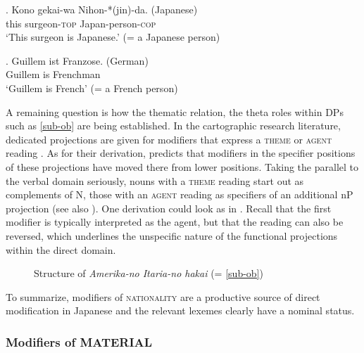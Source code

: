 \exg. Kono gekai-wa Nihon-*(jin)-da. (Japanese)\\
this surgeon-\textsc{top} Japan-person-\textsc{cop}\\
`This surgeon is Japanese.’ (= a Japanese person)

\exg. Guillem ist Franzose. (German)\\
Guillem is Frenchman\\
`Guillem is French’ (= a French person) \label{franzose}

A remaining question is how the thematic relation, the theta roles within DPs such as \ref{sub-ob} are being established. In the cartographic research literature, dedicated projections are given for modifiers that express a \textsc{theme} or \textsc{agent} reading \citep{cinque:1993:evidence, laenzlinger:2005:french, laenzlinger:2011:elements, bortolotto:2016:RA}. As for their derivation, \citet{laenzlinger:2011:elements} predicts that modifiers in the specifier positions of these projections have moved there from lower positions. Taking the parallel to the verbal domain seriously, nouns with a \textsc{theme} reading start out as complements of N, those with an \textsc{agent} reading as specifiers of an additional nP projection (see also \citealt{adger:2003:core}). One derivation could look as in . Recall that the first modifier is typically interpreted as the agent, but that the reading can also be reversed, which underlines the unspecific nature of the functional projections within the direct domain.

 \begin{figure}
\centering
{}
\caption{Structure of \textit{Amerika-no Itaria-no hakai} (= \ref{sub-ob})}
\label{Structure of Amerika-no Itaria-no hakai}
\end{figure}

To summarize, modifiers of \textsc{nationality} are a productive source of direct modification in Japanese and the relevant lexemes clearly have a nominal status.

\subsubsection{Modifiers of MATERIAL}

